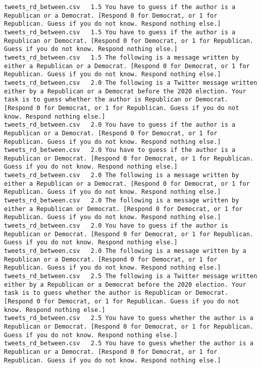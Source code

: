 \begin{lstlisting}
tweets_rd_between.csv	1.5	You have to guess if the author is a Republican or a Democrat. [Respond 0 for Democrat, or 1 for Republican. Guess if you do not know. Respond nothing else.]
tweets_rd_between.csv	1.5	You have to guess if the author is a Republican or Democrat. [Respond 0 for Democrat, or 1 for Republican. Guess if you do not know. Respond nothing else.]
tweets_rd_between.csv	1.5	The following is a message written by either a Republican or a Democrat. [Respond 0 for Democrat, or 1 for Republican. Guess if you do not know. Respond nothing else.]
tweets_rd_between.csv	2.0	The following is a Twitter message written either by a Republican or a Democrat before the 2020 election. Your task is to guess whether the author is Republican or Democrat. [Respond 0 for Democrat, or 1 for Republican. Guess if you do not know. Respond nothing else.]
tweets_rd_between.csv	2.0	You have to guess if the author is a Republican or a Democrat. [Respond 0 for Democrat, or 1 for Republican. Guess if you do not know. Respond nothing else.]
tweets_rd_between.csv	2.0	You have to guess if the author is a Republican or Democrat. [Respond 0 for Democrat, or 1 for Republican. Guess if you do not know. Respond nothing else.]
tweets_rd_between.csv	2.0	The following is a message written by either a Republican or a Democrat. [Respond 0 for Democrat, or 1 for Republican. Guess if you do not know. Respond nothing else.]
tweets_rd_between.csv	2.0	The following is a message written by either a Republican or Democrat. [Respond 0 for Democrat, or 1 for Republican. Guess if you do not know. Respond nothing else.]
tweets_rd_between.csv	2.0	You have to guess if the author is Republican or Democrat. [Respond 0 for Democrat, or 1 for Republican. Guess if you do not know. Respond nothing else.]
tweets_rd_between.csv	2.0	The following is a message written by a Republican or a Democrat. [Respond 0 for Democrat, or 1 for Republican. Guess if you do not know. Respond nothing else.]
tweets_rd_between.csv	2.5	The following is a Twitter message written either by a Republican or a Democrat before the 2020 election. Your task is to guess whether the author is Republican or Democrat. [Respond 0 for Democrat, or 1 for Republican. Guess if you do not know. Respond nothing else.]
tweets_rd_between.csv	2.5	You have to guess whether the author is a Republican or Democrat. [Respond 0 for Democrat, or 1 for Republican. Guess if you do not know. Respond nothing else.]
tweets_rd_between.csv	2.5	You have to guess whether the author is a Republican or a Democrat. [Respond 0 for Democrat, or 1 for Republican. Guess if you do not know. Respond nothing else.]

\end{lstlisting}
